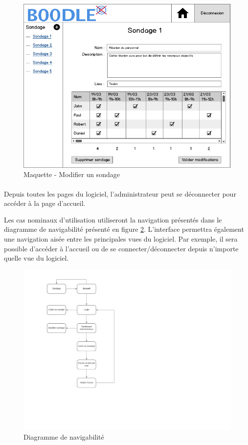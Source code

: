 \documentclass[]{report}
\begin{document}
\begin{figure}[h]
	\caption{Maquette - Modifier un sondage}
	\label{maquette_modifierEvenement}
	\centering
	\includegraphics[scale=0.7]{figures/maquettes/modifierEvenement.png}
\end{figure}

\paragraph{}Depuis toutes les pages du logiciel, l'administrateur peut se déconnecter pour accéder à la page d'accueil.
\par Les cas nominaux d'utilisation utiliseront la navigation présentés dans le diagramme de navigabilité présenté en figure \ref{diagramme_navigabilite}. L'interface permettra également une navigation aisée entre les principales vues du logiciel. Par exemple, il sera possible d'accéder à l'accueil ou de se connecter/déconnecter depuis n'importe quelle vue du logiciel.

\begin{figure}[h]
	\caption{Diagramme de navigabilité}
	\label{diagramme_navigabilite}
	\centering
	\includegraphics[scale=1]{figures/diagrammes/navigabilite.png}
\end{figure}
\end{document}
